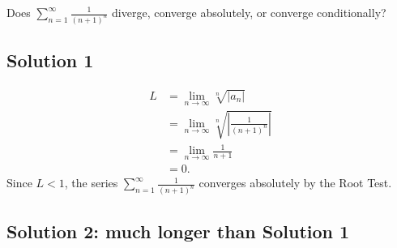 \documentclass{article}
\begin{document}
\noindent
Does $\displaystyle \sum_{n=1}^\infty \frac{1}{(n+1)^n}$
diverge, converge absolutely, or converge conditionally?

\subsection*{Solution 1}

\begin{align*}
L&=\lim_{n \to \infty} \sqrt[n]{|a_n|}\\
&= \lim_{n \to \infty} \sqrt[n]{\left| \frac{1}{(n+1)^n} \right|}\\
&= \lim_{n \to \infty} \frac{1}{n+1}\\
&= 0.
\end{align*}
Since $L < 1$, the series $\displaystyle \sum_{n=1}^\infty \frac{1}{(n+1)^n}$ converges absolutely by the Root Test.

\subsection*{Solution 2: much longer than Solution 1}
\end{document}
